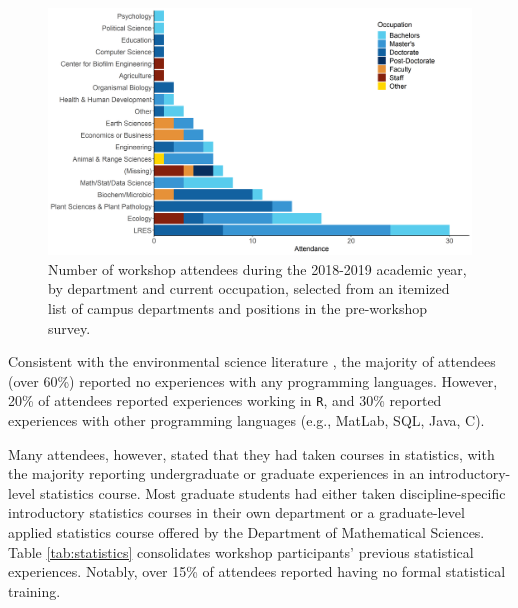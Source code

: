 \documentclass[12pt]{article}
\begin{document}
{
\begin{figure}[h!]
\centering
\includegraphics[width = \textwidth]{images/final_colors_attendance.png}
\caption{Number of workshop attendees during the 2018-2019 academic year, by
department and current occupation, selected from an itemized list of campus
departments and positions in the pre-workshop survey.}
    \label{fig:departments}
\end{figure}
}

\quad Consistent with the environmental science literature \citep{andelman, 
hampton, hernandez, carpentry}, the majority of attendees (over 60\%) reported
no experiences with any programming languages. However, 20\% of attendees 
reported experiences working in \texttt{R}, and 30\% reported experiences with
other programming languages (e.g., MatLab, SQL, Java, C). 

\quad Many attendees, however, stated that they had taken courses in statistics, 
with the majority reporting undergraduate or graduate experiences in an
introductory-level statistics course. Most graduate students had either taken 
discipline-specific introductory statistics courses in their own department or
a graduate-level applied statistics course offered by the Department of
Mathematical Sciences. Table \ref{tab:statistics} consolidates workshop
participants' previous statistical experiences. Notably, over 15\% of
attendees reported having no formal statistical training. 
\end{document}
